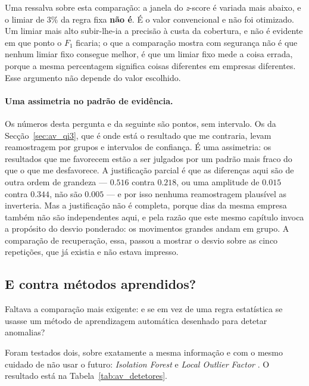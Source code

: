 Uma ressalva sobre esta comparação: a janela do \emph{z}-score é variada mais abaixo, e o limiar
de $3\%$ da regra fixa \textbf{não é}. É o valor convencional e não foi otimizado. Um limiar mais
alto subir-lhe-ia a precisão à custa da cobertura, e não é evidente em que ponto o $F_1$ ficaria;
o que a comparação mostra com segurança não é que nenhum limiar fixo consegue melhor, é que um
limiar fixo mede a coisa errada, porque a mesma percentagem significa coisas diferentes em
empresas diferentes. Esse argumento não depende do valor escolhido.

\paragraph{Uma assimetria no padrão de evidência.}
Os números desta pergunta e da seguinte são pontos, sem intervalo. Os da
Secção~\ref{sec:av_qi3}, que é onde está o resultado que me contraria, levam reamostragem por
grupos e intervalos de confiança. É uma assimetria: os resultados que me favorecem estão a ser
julgados por um padrão mais fraco do que o que me desfavorece. A justificação parcial é que as
diferenças aqui são de outra ordem de grandeza --- $0.516$ contra $0.218$, ou uma amplitude de
$0.015$ contra $0.344$, não são $0.005$ --- e por isso nenhuma reamostragem plausível as
inverteria. Mas a justificação não é completa, porque dias da mesma empresa também não são
independentes aqui, e pela razão que este mesmo capítulo invoca a propósito do desvio ponderado:
os movimentos grandes andam em grupo. A comparação de recuperação, essa, passou a mostrar o
desvio sobre as cinco repetições, que já existia e não estava impresso.

\subsection{E contra métodos aprendidos?}

Faltava a comparação mais exigente: e se em vez de uma regra estatística se usasse um método de
aprendizagem automática desenhado para detetar anomalias?

Foram testados dois, sobre exatamente a mesma informação e com o mesmo cuidado de não usar o futuro:
\emph{Isolation Forest} \autocite{liu2008isolation} e \emph{Local Outlier Factor}
\autocite{breunig2000lof}. O resultado está na Tabela~\ref{tab:av_detetores}.

